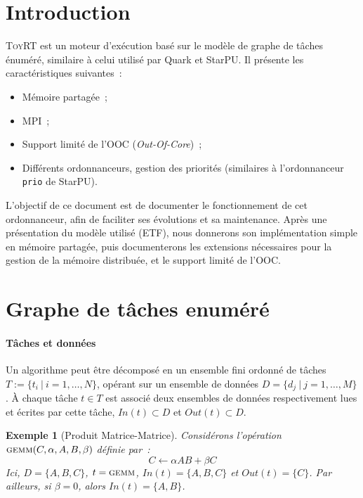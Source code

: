 \documentclass[11pt]{article}
\theoremstyle{plain} %
\newtheorem{example}[thm]{Exemple}
\theoremstyle{definition} %
\begin{document}
\section{Introduction}
\label{sec:introduction}
\textsc{ToyRT} est un moteur d'exécution basé sur le modèle de graphe de tâches énuméré, similaire à celui utilisé par Quark et StarPU.
Il présente les caractéristiques suivantes~:~
\begin{itemize}
\item Mémoire partagée~;
\item MPI~;
\item Support limité de l'OOC (\emph{Out-Of-Core})~;
\item Différents ordonnanceurs, gestion des priorités (similaires à l'ordonnanceur \texttt{prio} de StarPU).
\end{itemize}

L'objectif de ce document est de documenter le fonctionnement de cet ordonnanceur, afin de faciliter ses évolutions et sa maintenance.
Après une présentation du modèle utilisé (ETF), nous donnerons son implémentation simple en mémoire partagée, puis documenterons les extensions nécessaires pour la gestion de la mémoire distribuée, et le support limité de l'OOC.


\section{Graphe de tâches enuméré}
\label{sec:graphe-de-taches}

\paragraph{Tâches et données}
\label{sec:taches-et-donnees}
Un algorithme peut être décomposé en un ensemble fini ordonné de tâches $T := \{t_i \ | \ i = 1, \dots, N \}$, opérant sur un ensemble de données $D = \{ d_j \ | \ j = 1,\dots, M\}$.
À chaque tâche $t \in T$ est associé deux ensembles de données respectivement lues et écrites par cette tâche, $In(t) \subset D$ et $Out(t) \subset D$.

\begin{example}[Produit Matrice-Matrice]
  \label{ex:gemm}
  Considérons l'opération $\textsc{gemm}(C, \alpha, A, B, \beta)$ définie par~:~
  \begin{equation*}
    C \gets \alpha A B + \beta C
  \end{equation*}
  Ici, $D = \{A, B, C \}$, $t = \textsc{gemm}$, $In(t) = \{A, B, C\}$ et $Out(t) = \{C\}$.
  Par ailleurs, si $\beta = 0$, alors $In(t) = \{A, B\}$.
\end{example}
\end{document}
